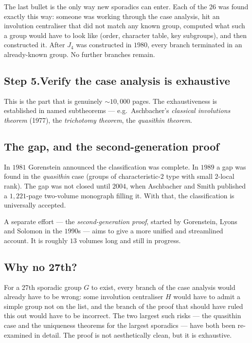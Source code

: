 \documentclass[11pt]{article}
\begin{document}
The last bullet is the only way new sporadics can enter. Each of the
26 was found exactly this way: someone was working through the case
analysis, hit an involution centraliser that did not match any known
group, computed what such a group would have to look like (order,
character table, key subgroups), and then constructed it. After
$J_4$ was constructed in $1980$, every branch terminated in an
already-known group. No further branches remain.

\subsection*{Step 5.\quad Verify the case analysis is exhaustive}

This is the part that is genuinely $\sim 10{,}000$ pages. The
exhaustiveness is established in named subtheorems --- e.g.\
Aschbacher's \emph{classical involutions theorem} (1977), the
\emph{trichotomy theorem}, the \emph{quasithin theorem}.

\subsection*{The gap, and the second-generation proof}

In $1981$ Gorenstein announced the classification was complete. In
$1989$ a gap was found in the \emph{quasithin} case (groups of
characteristic-$2$ type with small $2$-local rank). The gap was not
closed until $2004$, when Aschbacher and Smith published a
$1{,}221$-page two-volume monograph filling it. With that, the
classification is universally accepted.

A separate effort --- the \emph{second-generation proof}, started by
Gorenstein, Lyons and Solomon in the $1990$s --- aims to give a more
unified and streamlined account. It is roughly $13$ volumes long and
still in progress.

\subsection*{Why no 27th?}

For a 27th sporadic group $G$ to exist, every branch of the case
analysis would already have to be wrong: some involution
centraliser $H$ would have to admit a simple group not on the list,
and the branch of the proof that should have ruled this out would
have to be incorrect. The two largest such risks --- the quasithin
case and the uniqueness theorems for the largest sporadics --- have
both been re-examined in detail. The proof is not aesthetically
clean, but it is exhaustive.
\end{document}
